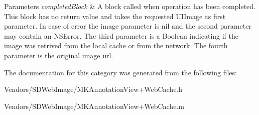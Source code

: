 \begin{DoxyParams}{Parameters}
{\em completed\+Block} & A block called when operation has been completed. This block has no return value and takes the requested U\+I\+Image as first parameter. In case of error the image parameter is nil and the second parameter may contain an N\+S\+Error. The third parameter is a Boolean indicating if the image was retrived from the local cache or from the network. The fourth parameter is the original image url. \\
\hline
\end{DoxyParams}


The documentation for this category was generated from the following files\+:\begin{DoxyCompactItemize}
\item 
Vendors/\+S\+D\+Web\+Image/M\+K\+Annotation\+View+\+Web\+Cache.\+h\item 
Vendors/\+S\+D\+Web\+Image/M\+K\+Annotation\+View+\+Web\+Cache.\+m\end{DoxyCompactItemize}
